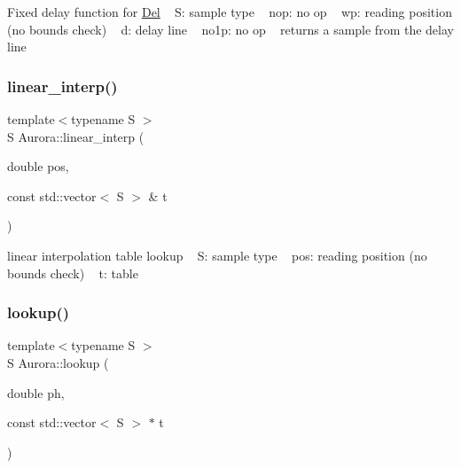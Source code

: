 Fixed delay function for \hyperlink{class_aurora_1_1_del}{Del} ~\newline
S\+: sample type ~\newline
nop\+: no op ~\newline
wp\+: reading position (no bounds check) ~\newline
d\+: delay line ~\newline
no1p\+: no op ~\newline
returns a sample from the delay line \mbox{\label{namespace_aurora_acdc5f35b9cbf54f7fc84a423d76bd488}} 
\subsubsection{\texorpdfstring{linear\+\_\+interp()}{linear\_interp()}}
{\footnotesize\ttfamily template$<$typename S $>$ \\
S Aurora\+::linear\+\_\+interp (\begin{DoxyParamCaption}\item[{double}]{pos,  }\item[{const std\+::vector$<$ S $>$ \&}]{t }\end{DoxyParamCaption})\hspace{0.3cm}{\ttfamily [inline]}}

linear interpolation table lookup ~\newline
S\+: sample type ~\newline
pos\+: reading position (no bounds check) ~\newline
t\+: table \mbox{\label{namespace_aurora_ae0082f7bc3946a88145d54bacd0c6ff3}} 
\subsubsection{\texorpdfstring{lookup()}{lookup()}}
{\footnotesize\ttfamily template$<$typename S $>$ \\
S Aurora\+::lookup (\begin{DoxyParamCaption}\item[{double}]{ph,  }\item[{const std\+::vector$<$ S $>$ $\ast$}]{t }\end{DoxyParamCaption})\hspace{0.3cm}{\ttfamily [inline]}}

